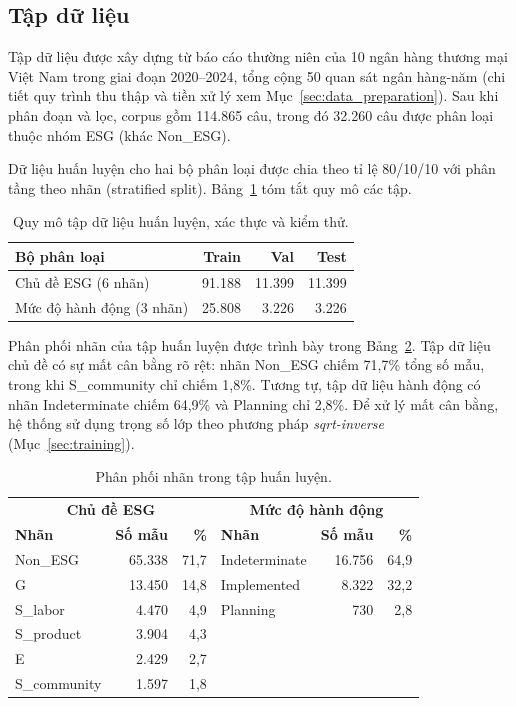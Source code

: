\subsection{Tập dữ liệu}
\label{subsec:dataset}

Tập dữ liệu được xây dựng từ báo cáo thường niên của 10 ngân hàng thương mại Việt Nam trong giai đoạn 2020--2024, tổng cộng 50 quan sát ngân hàng-năm (chi tiết quy trình thu thập và tiền xử lý xem Mục~\ref{sec:data_preparation}). Sau khi phân đoạn và lọc, corpus gồm 114.865 câu, trong đó 32.260 câu được phân loại thuộc nhóm ESG (khác Non\_ESG).

Dữ liệu huấn luyện cho hai bộ phân loại được chia theo tỉ lệ 80/10/10 với phân tầng theo nhãn (stratified split). Bảng~\ref{tab:data_split} tóm tắt quy mô các tập.

\begin{table}[H]
\centering
\caption{Quy mô tập dữ liệu huấn luyện, xác thực và kiểm thử.}
\label{tab:data_split}
\begin{tabular}{lrrr}
\toprule
\textbf{Bộ phân loại} & \textbf{Train} & \textbf{Val} & \textbf{Test} \\
\midrule
Chủ đề ESG (6 nhãn)        & 91.188 & 11.399 & 11.399 \\
Mức độ hành động (3 nhãn)   & 25.808 &  3.226 &  3.226 \\
\bottomrule
\end{tabular}
\end{table}

Phân phối nhãn của tập huấn luyện được trình bày trong Bảng~\ref{tab:label_dist}. Tập dữ liệu chủ đề có sự mất cân bằng rõ rệt: nhãn Non\_ESG chiếm 71,7\% tổng số mẫu, trong khi S\_community chỉ chiếm 1,8\%. Tương tự, tập dữ liệu hành động có nhãn Indeterminate chiếm 64,9\% và Planning chỉ 2,8\%. Để xử lý mất cân bằng, hệ thống sử dụng trọng số lớp theo phương pháp \textit{sqrt-inverse} (Mục~\ref{sec:training}).

\begin{table}[H]
\centering
\caption{Phân phối nhãn trong tập huấn luyện.}
\label{tab:label_dist}
\begin{tabular}{lrr|lrr}
\toprule
\multicolumn{3}{c|}{\textbf{Chủ đề ESG}} & \multicolumn{3}{c}{\textbf{Mức độ hành động}} \\
\textbf{Nhãn} & \textbf{Số mẫu} & \textbf{\%} & \textbf{Nhãn} & \textbf{Số mẫu} & \textbf{\%} \\
\midrule
Non\_ESG      & 65.338 & 71,7 & Indeterminate & 16.756 & 64,9 \\
G             & 13.450 & 14,8 & Implemented   &  8.322 & 32,2 \\
S\_labor      &  4.470 &  4,9 & Planning      &    730 &  2,8 \\
S\_product    &  3.904 &  4,3 &               &        &      \\
E             &  2.429 &  2,7 &               &        &      \\
S\_community  &  1.597 &  1,8 &               &        &      \\
\bottomrule
\end{tabular}
\end{table}


